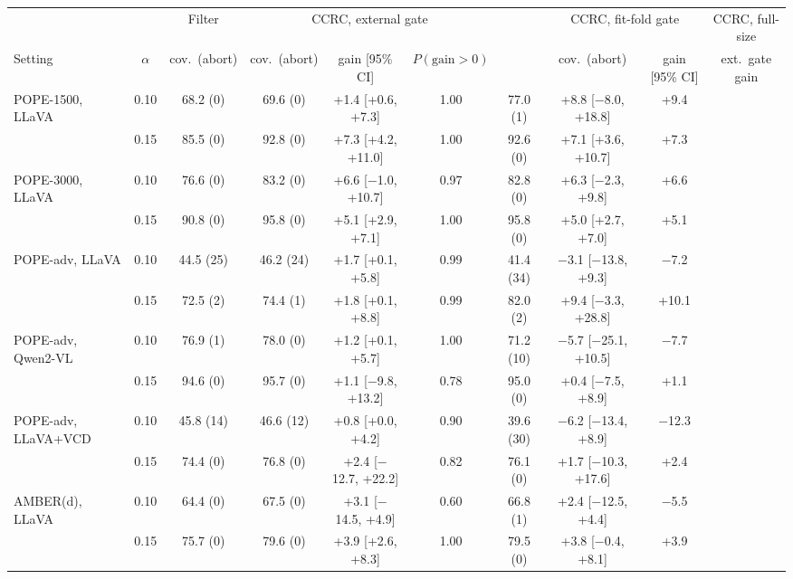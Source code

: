 \begin{tabular}{lccccccccc}
\toprule
 & & Filter & \multicolumn{3}{c}{CCRC, external gate} & & \multicolumn{2}{c}{CCRC, fit-fold gate} & CCRC, full-size\\
\cmidrule(lr){4-6}\cmidrule(lr){8-9}
Setting & $\alpha$ & cov.\ (abort) & cov.\ (abort) & gain [95\% CI] & $P(\text{gain}>0)$ & & cov.\ (abort) & gain [95\% CI] & ext.\ gate gain\\
\midrule
POPE-1500, LLaVA & 0.10 & 68.2 (0) & 69.6 (0) & +1.4 [+0.6, +7.3] & 1.00 & 77.0 (1) & +8.8 [$-$8.0, +18.8] & +9.4\\
 & 0.15 & 85.5 (0) & 92.8 (0) & +7.3 [+4.2, +11.0] & 1.00 & 92.6 (0) & +7.1 [+3.6, +10.7] & +7.3\\
\addlinespace
POPE-3000, LLaVA & 0.10 & 76.6 (0) & 83.2 (0) & +6.6 [$-$1.0, +10.7] & 0.97 & 82.8 (0) & +6.3 [$-$2.3, +9.8] & +6.6\\
 & 0.15 & 90.8 (0) & 95.8 (0) & +5.1 [+2.9, +7.1] & 1.00 & 95.8 (0) & +5.0 [+2.7, +7.0] & +5.1\\
\addlinespace
POPE-adv, LLaVA & 0.10 & 44.5 (25) & 46.2 (24) & +1.7 [+0.1, +5.8] & 0.99 & 41.4 (34) & $-$3.1 [$-$13.8, +9.3] & $-$7.2\\
 & 0.15 & 72.5 (2) & 74.4 (1) & +1.8 [+0.1, +8.8] & 0.99 & 82.0 (2) & +9.4 [$-$3.3, +28.8] & +10.1\\
\addlinespace
POPE-adv, Qwen2-VL & 0.10 & 76.9 (1) & 78.0 (0) & +1.2 [+0.1, +5.7] & 1.00 & 71.2 (10) & $-$5.7 [$-$25.1, +10.5] & $-$7.7\\
 & 0.15 & 94.6 (0) & 95.7 (0) & +1.1 [$-$9.8, +13.2] & 0.78 & 95.0 (0) & +0.4 [$-$7.5, +8.9] & +1.1\\
\addlinespace
POPE-adv, LLaVA+VCD & 0.10 & 45.8 (14) & 46.6 (12) & +0.8 [+0.0, +4.2] & 0.90 & 39.6 (30) & $-$6.2 [$-$13.4, +8.9] & $-$12.3\\
 & 0.15 & 74.4 (0) & 76.8 (0) & +2.4 [$-$12.7, +22.2] & 0.82 & 76.1 (0) & +1.7 [$-$10.3, +17.6] & +2.4\\
\addlinespace
AMBER(d), LLaVA & 0.10 & 64.4 (0) & 67.5 (0) & +3.1 [$-$14.5, +4.9] & 0.60 & 66.8 (1) & +2.4 [$-$12.5, +4.4] & $-$5.5\\
 & 0.15 & 75.7 (0) & 79.6 (0) & +3.9 [+2.6, +8.3] & 1.00 & 79.5 (0) & +3.8 [$-$0.4, +8.1] & +3.9\\
\bottomrule
\end{tabular}
